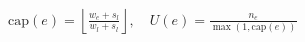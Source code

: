 \documentclass[12pt]{article}
\begin{document}
\begin{center}
\Large
$\mathrm{cap}(e)=\left\lfloor\frac{w_e+s_l}{w_l+s_l}\right\rfloor,\quad U(e)=\frac{n_e}{\max(1,\mathrm{cap}(e))}$
\end{center}
\end{document}
